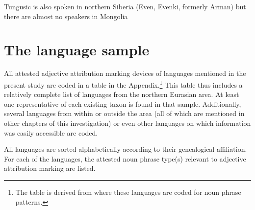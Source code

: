 
Tungusic is also spoken in northern Siberia (Even, Evenki, formerly Arman) but there are almost no speakers in Mongolia

\section{The language sample}
All attested adjective attribution marking devices of languages mentioned in the present study are coded in a table in the Appendix.\footnote{The table is derived from \citet{AUTOTYP-NP} where these languages are coded for noun phrase patterns.} This table thus includes a relatively complete list of languages from the northern Eurasian area. At least one representative of each existing taxon is found in that sample. Additionally, several languages from within or outside the area (all of which are mentioned in other chapters of this investigation) or even other languages on which information was easily accessible are coded.

All languages are sorted alphabetically according to their genealogical affiliation. For each of the languages, the attested noun phrase type(s) relevant to adjective attribution marking are listed.

